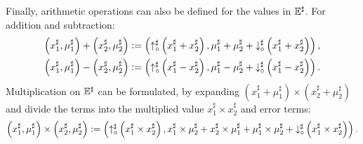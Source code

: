Finally, arithmetic operations can also be defined for the values in
$\mathbb{E}^\sharp$.  For addition and subtraction:
\begin{equation}
    \begin{aligned}
    \left( x^\sharp_1, \mu^\sharp_1 \right) +
    \left( x^\sharp_2, \mu^\sharp_2 \right)
    &\vcentcolon=
        \left(
            \operatorname{\uparrow^\sharp_\circ}\left(x^\sharp_1 + x^\sharp_2\right),
            \mu^\sharp_1 + \mu^\sharp_2 +
            \operatorname{\downarrow^\sharp_\circ}\left(x^\sharp_1 + x^\sharp_2\right)
        \right), \\
    \left( x^\sharp_1, \mu^\sharp_1 \right) -
    \left( x^\sharp_2, \mu^\sharp_2 \right)
    &\vcentcolon=
        \left(
            \operatorname{\uparrow^\sharp_\circ}\left(x^\sharp_1 - x^\sharp_2\right),
            \mu^\sharp_1 - \mu^\sharp_2 +
            \operatorname{\downarrow^\sharp_\circ}\left(x^\sharp_1 - x^\sharp_2\right)
        \right).
    \end{aligned}
    \label{bg:eq:error_arithmetic}
\end{equation}
Multiplication on $\mathbb{E}^\sharp$ can be formulated, by expanding $\left(
x^\sharp_1 + \mu^\sharp_1 \right) \times \left( x^\sharp_2 + \mu^\sharp_2
\right)$ and divide the terms into the multiplied value $x^\sharp_1 \times
x^\sharp_2$ and error terms:
\begin{equation}
    \left( x^\sharp_1, \mu^\sharp_1 \right) \times
    \left( x^\sharp_2, \mu^\sharp_2 \right)
    \vcentcolon=
        \left(
            \operatorname{\uparrow^\sharp_\circ}\left(x^\sharp_1 \times x^\sharp_2\right),
            x^\sharp_1 \times \mu^\sharp_2 + x^\sharp_2 \times \mu^\sharp_1 +
            \mu^\sharp_1 \times \mu^\sharp_2 +
            \operatorname{\downarrow^\sharp_\circ}\left(x^\sharp_1 \times x^\sharp_2\right)
        \right).
    \label{bg:eq:error_arithmetic}
\end{equation}

